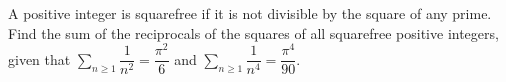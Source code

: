 A positive integer is squarefree if it is not divisible by the square of any prime. Find the sum of the reciprocals of the squares of all squarefree positive integers, given that $\displaystyle\sum_{n\ge1}\dfrac1{n^2}=\dfrac{\pi^2}{6}$ and $\displaystyle\sum_{n\ge1}\dfrac1{n^4}=\dfrac{\pi^4}{90}$.

